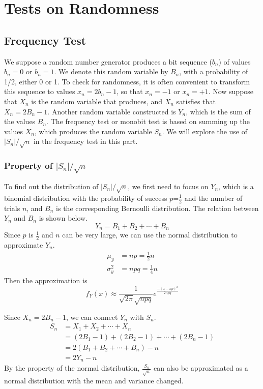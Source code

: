 \documentclass[a4paper,12pt]{article}
\begin{document}
\section{Tests on Randomness}
\subsection{Frequency Test}
\noindent We suppose a random number generator produces a bit sequence ($b_n$) of values $b_n = 0$ or $b_n = 1$. We denote this random variable by $B_n$, with a probability of 1/2, either 0 or
1. To check for randomness, it is often convenient to transform this sequence to values $x_n = 2b_n -1$, so that $x_n = -1$ or $x_n = +1$. Now suppose that $X_n$ is the random variable that produces, and $X_n$ satisfies that $X_n=2B_n-1$. Another random variable constructed is $Y_n$, which is the sum of the values $B_n$. The frequency test or monobit test is based on summing up the values $X_n$, which produces the random variable $S_n$. We will explore the use of $\left|S_{n}\right| / \sqrt{n}$ in the frequency test in this part.
\subsubsection{Property of $\left|S_{n}\right| / \sqrt{n}$}
\noindent  To find out the distribution of $\left|S_{n}\right| / \sqrt{n}$, we first need to focus on $Y_n$, which is a binomial distribution with the probability of success $p$=$\frac{1}{2}$ and the number of trials $n$, and $B_n$ is the corresponding Bernoulli distribution. The relation between $Y_n$ and $B_n$ is shown below.
\begin{equation}
Y_n=B_1+B_2+\cdots+B_n
\end{equation}
Since $p$ is $\frac{1}{2}$ and $n$ can be very large, we can use the normal distribution to approximate $Y_n$.
\begin{equation*}
\begin{split}
\mu_y&=np=\frac{1}{2}n\\
\sigma_y^2&=npq=\frac{1}{4}n
\end{split}
\end{equation*}
\noindent Then the approximation is
\begin{equation}
f_Y(x)\approx \frac{1}{\sqrt{2\pi}\sqrt{npq}}e^{\frac{-(x-np)^2}{2npq}}
\end{equation}

\noindent Since $X_n=2B_n-1$, we can connect $Y_n$ with $S_n$.
\begin{equation}
\begin{split}
S_n&=X_1+X_2+\cdots+X_n\\
   &=(2B_1-1)+(2B_2-1)+\cdots+(2B_n-1)\\
   &=2(B_1+B_2+\cdots+B_n)-n\\
   &=2Y_n-n
\end{split}
\end{equation}
By the property of the normal distribution, $\frac{S_n}{\sqrt{n}}$ can also be approximated as a normal distribution with the mean and variance changed.
\end{document}
